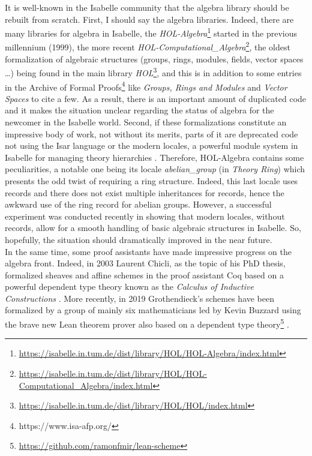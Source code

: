 \documentclass[12pt]{scrartcl}
\begin{document}
It is well-known in the Isabelle community that the algebra library should be rebuilt from scratch. First, I should say the algebra libraries. Indeed, there are many libraries for algebra in Isabelle, the \textit{HOL-Algebra}\footnote{\url{https://isabelle.in.tum.de/dist/library/HOL/HOL-Algebra/index.html}} started in the previous millennium (1999), the more recent \textit{HOL-Computational\_Algebra}\footnote{\url{https://isabelle.in.tum.de/dist/library/HOL/HOL-Computational_Algebra/index.html}}, the oldest formalization of algebraic structures (groups, rings, modules, fields, vector spaces \dots) being found in the main library \textit{HOL}\footnote{\url{https://isabelle.in.tum.de/dist/library/HOL/HOL/index.html}}, and this is in addition to some entries in the Archive of Formal Proofs\footnote{https://www.isa-afp.org/} like \textit{Groups, Rings and Modules} \cite{Group-Ring-Module-AFP} and \textit{Vector Spaces} \cite{VectorSpace-AFP} to cite a few. As a result, there is an important amount of duplicated code and it makes the situation unclear regarding the status of algebra for the newcomer in the Isabelle world. Second, if these formalizations constitute an impressive body of work, not without its merits, parts of it are deprecated code not using the Isar language or the modern locales, a powerful module system in Isabelle for managing theory hierarchies \cite{ballarin2014}. Therefore, HOL-Algebra contains some peculiarities, a notable one being its locale \emph{abelian\_group} (in \textit{Theory Ring}) which presents the odd twist of requiring a ring structure. Indeed, this last locale uses records and there does not exist multiple inheritances for records, hence the awkward use of the ring record for abelian groups. However, a successful experiment was conducted recently in \cite{ballarin20} showing that modern locales, without records, allow for a smooth handling of basic algebraic structures in Isabelle. So, hopefully, the situation should dramatically improved in the near future. \\
In the same time, some proof assistants have made impressive progress on the algebra front. Indeed, in 2003 Laurent Chicli, as the topic of his PhD thesis, formalized sheaves and affine schemes in the proof assistant Coq based on a powerful dependent type theory known as the \emph{Calculus of Inductive Constructions} \cite{chiclithesis}. More recently, in 2019 Grothendieck's schemes have been formalized by a group of mainly six mathematicians led by Kevin Buzzard using the brave new Lean theorem prover also based on a dependent type theory\footnote{\url{https://github.com/ramonfmir/lean-scheme}} \cite{schemesinLean}. \\
\end{document}

